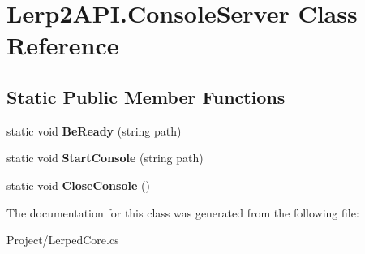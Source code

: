 \hypertarget{class_lerp2_a_p_i_1_1_console_server}{}\section{Lerp2\+A\+P\+I.\+Console\+Server Class Reference}
\label{class_lerp2_a_p_i_1_1_console_server}
\subsection*{Static Public Member Functions}
\begin{DoxyCompactItemize}
\item 
\mbox{\label{class_lerp2_a_p_i_1_1_console_server_af95048182d2bf4acff1ebbcd18466bdc}} 
static void {\bfseries Be\+Ready} (string path)
\item 
\mbox{\label{class_lerp2_a_p_i_1_1_console_server_ababcc7dcd82a5ff056e3d511ff573f55}} 
static void {\bfseries Start\+Console} (string path)
\item 
\mbox{\label{class_lerp2_a_p_i_1_1_console_server_a9f9bdc6bc8ee74f1193d9d55ba7b0ea6}} 
static void {\bfseries Close\+Console} ()
\end{DoxyCompactItemize}


The documentation for this class was generated from the following file\+:\begin{DoxyCompactItemize}
\item 
Project/Lerped\+Core.\+cs\end{DoxyCompactItemize}
